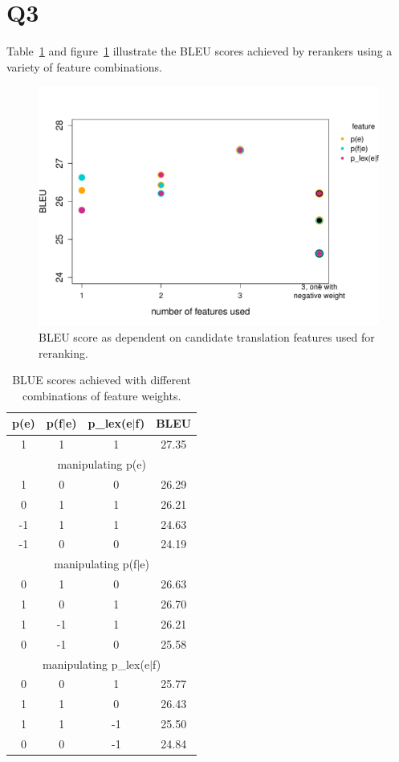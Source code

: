\section*{Q3}
Table~\ref{BLEUtable} and figure~\ref{BLEU} illustrate the BLEU scores achieved by rerankers using a variety of feature combinations.

\begin{figure}
	\centering
	\includegraphics[scale=.75]{figures/q3.pdf}
	\caption{BLEU score as dependent on candidate translation features used for reranking.}\label{BLEU}
\end{figure}

\begin{table}
	\centering
	\begin{tabular}{||c|c|c|c||}
		\hline
		\textbf{p(e)} & \textbf{p(f$|$e)} & \textbf{p\_lex(e$|$f)} & \textbf{BLEU}\\
		\hline
		1&1&1&27.35\\
		\hline
		\multicolumn{4}{||c||}{manipulating p(e)}\\
		\hline
		1&0&0&26.29\\
		0&1&1&26.21\\
		-1&1&1&24.63\\
		-1&0&0&24.19\\
		\hline
		\multicolumn{4}{||c||}{manipulating p(f$|$e)}\\
		\hline
		0&1&0&26.63\\
		1&0&1&26.70\\
		1&-1&1&26.21\\
		0&-1&0&25.58\\
		\hline
		\multicolumn{4}{||c||}{manipulating p\_lex(e$|$f)}\\
		\hline
		0&0&1&25.77\\
		1&1&0&26.43\\
		1&1&-1&25.50\\
		0&0&-1&24.84\\
		\hline
		\end{tabular}
		\caption{BLUE scores achieved with different combinations of feature weights.}\label{BLEUtable}
\end{table}

